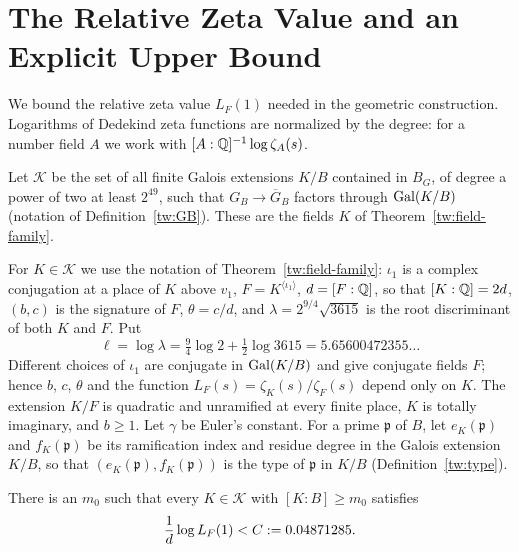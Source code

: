 \section{The Relative Zeta Value and an Explicit Upper Bound}\label{an:section}

We bound the relative zeta value $L_F(1)$ needed in the geometric
construction. Logarithms of Dedekind zeta functions are normalized by the
degree: for a number field $A$ we work with $[A:\mathbb Q]^{-1}\log\zeta_A(s)$.

\begin{definition}\label{an:family}
Let $\mathcal K$ be the set of all finite Galois extensions $K/B$ contained
in $B_G$, of degree a power of two at least $2^{49}$, such that
$G_B\to\overline G_B$ factors through $\operatorname{Gal}(K/B)$ (notation of
Definition~\ref{tw:GB}). These are the fields $K$ of
Theorem~\ref{tw:field-family}.
\end{definition}

For $K\in\mathcal K$ we use the notation of
Theorem~\ref{tw:field-family}: $\iota_1$ is a complex conjugation at a place of $K$ above
$v_1$, $F=K^{\langle\iota_1\rangle}$, $d=[F:\mathbb Q]$, so that $[K:\mathbb Q]=2d$, $(b,c)$
is the signature of $F$, $\theta=c/d$, and $\lambda=2^{9/4}\sqrt{3615}$ is the
root discriminant of both $K$ and $F$. Put
\[
 \ell=\log\lambda=\tfrac94\log2+\tfrac12\log3615=5.65600472355\ldots
\]
Different choices of $\iota_1$ are conjugate in $\operatorname{Gal}(K/B)$ and give
conjugate fields $F$; hence $b$, $c$, $\theta$ and the function
$L_F(s)=\zeta_K(s)/\zeta_F(s)$ depend only on $K$. The extension $K/F$ is
quadratic and unramified at every finite place, $K$ is totally imaginary,
and $b\ge1$. Let $\gamma$ be Euler's constant. For a
prime $\mathfrak p$ of $B$, let $e_K(\mathfrak p)$ and $f_K(\mathfrak p)$ be
its ramification index and residue degree in the Galois extension $K/B$, so
that $(e_K(\mathfrak p),f_K(\mathfrak p))$ is the type of $\mathfrak p$ in
$K/B$ (Definition~\ref{tw:type}).

\begin{theorem}\label{an:ceiling}
There is an $m_0$ such that every $K\in\mathcal K$ with $[K:B]\ge m_0$
satisfies
\[
 \frac1d\log L_F(1)<C:=0.04871285.
\]
\end{theorem}

